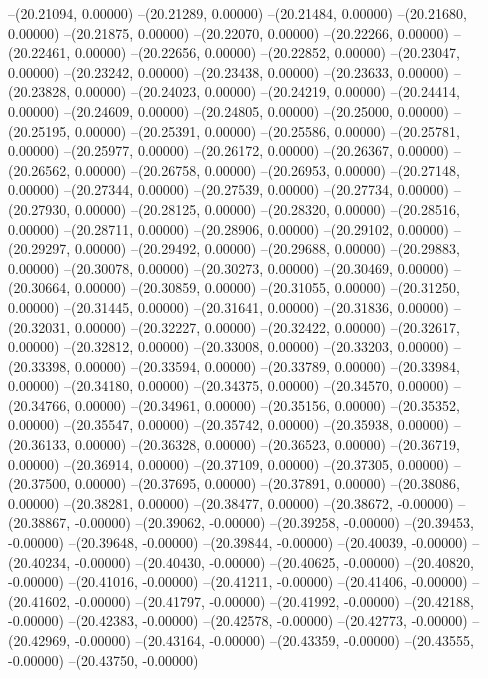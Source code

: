 --(20.21094, 0.00000)
--(20.21289, 0.00000)
--(20.21484, 0.00000)
--(20.21680, 0.00000)
--(20.21875, 0.00000)
--(20.22070, 0.00000)
--(20.22266, 0.00000)
--(20.22461, 0.00000)
--(20.22656, 0.00000)
--(20.22852, 0.00000)
--(20.23047, 0.00000)
--(20.23242, 0.00000)
--(20.23438, 0.00000)
--(20.23633, 0.00000)
--(20.23828, 0.00000)
--(20.24023, 0.00000)
--(20.24219, 0.00000)
--(20.24414, 0.00000)
--(20.24609, 0.00000)
--(20.24805, 0.00000)
--(20.25000, 0.00000)
--(20.25195, 0.00000)
--(20.25391, 0.00000)
--(20.25586, 0.00000)
--(20.25781, 0.00000)
--(20.25977, 0.00000)
--(20.26172, 0.00000)
--(20.26367, 0.00000)
--(20.26562, 0.00000)
--(20.26758, 0.00000)
--(20.26953, 0.00000)
--(20.27148, 0.00000)
--(20.27344, 0.00000)
--(20.27539, 0.00000)
--(20.27734, 0.00000)
--(20.27930, 0.00000)
--(20.28125, 0.00000)
--(20.28320, 0.00000)
--(20.28516, 0.00000)
--(20.28711, 0.00000)
--(20.28906, 0.00000)
--(20.29102, 0.00000)
--(20.29297, 0.00000)
--(20.29492, 0.00000)
--(20.29688, 0.00000)
--(20.29883, 0.00000)
--(20.30078, 0.00000)
--(20.30273, 0.00000)
--(20.30469, 0.00000)
--(20.30664, 0.00000)
--(20.30859, 0.00000)
--(20.31055, 0.00000)
--(20.31250, 0.00000)
--(20.31445, 0.00000)
--(20.31641, 0.00000)
--(20.31836, 0.00000)
--(20.32031, 0.00000)
--(20.32227, 0.00000)
--(20.32422, 0.00000)
--(20.32617, 0.00000)
--(20.32812, 0.00000)
--(20.33008, 0.00000)
--(20.33203, 0.00000)
--(20.33398, 0.00000)
--(20.33594, 0.00000)
--(20.33789, 0.00000)
--(20.33984, 0.00000)
--(20.34180, 0.00000)
--(20.34375, 0.00000)
--(20.34570, 0.00000)
--(20.34766, 0.00000)
--(20.34961, 0.00000)
--(20.35156, 0.00000)
--(20.35352, 0.00000)
--(20.35547, 0.00000)
--(20.35742, 0.00000)
--(20.35938, 0.00000)
--(20.36133, 0.00000)
--(20.36328, 0.00000)
--(20.36523, 0.00000)
--(20.36719, 0.00000)
--(20.36914, 0.00000)
--(20.37109, 0.00000)
--(20.37305, 0.00000)
--(20.37500, 0.00000)
--(20.37695, 0.00000)
--(20.37891, 0.00000)
--(20.38086, 0.00000)
--(20.38281, 0.00000)
--(20.38477, 0.00000)
--(20.38672, -0.00000)
--(20.38867, -0.00000)
--(20.39062, -0.00000)
--(20.39258, -0.00000)
--(20.39453, -0.00000)
--(20.39648, -0.00000)
--(20.39844, -0.00000)
--(20.40039, -0.00000)
--(20.40234, -0.00000)
--(20.40430, -0.00000)
--(20.40625, -0.00000)
--(20.40820, -0.00000)
--(20.41016, -0.00000)
--(20.41211, -0.00000)
--(20.41406, -0.00000)
--(20.41602, -0.00000)
--(20.41797, -0.00000)
--(20.41992, -0.00000)
--(20.42188, -0.00000)
--(20.42383, -0.00000)
--(20.42578, -0.00000)
--(20.42773, -0.00000)
--(20.42969, -0.00000)
--(20.43164, -0.00000)
--(20.43359, -0.00000)
--(20.43555, -0.00000)
--(20.43750, -0.00000)

